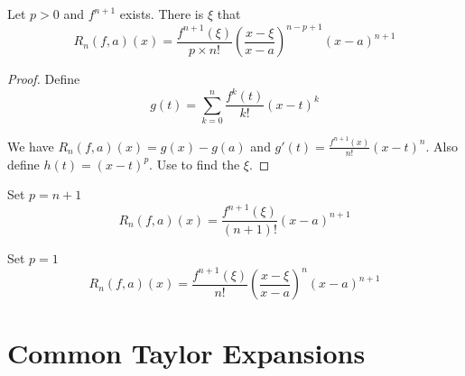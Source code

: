 \begin{theorem}
    Let $p > 0$ and $f^{n+1}$ exists. There is $\xi$ that
    \begin{equation}
        R_n(f,a)(x) = \frac{f^{n+1}(\xi)}{p \times n!}\left( \frac{x-\xi}{x-a} \right)^{n-p+1} (x-a)^{n+1}
    \end{equation}
\end{theorem}
\begin{proof}
    Define
    \begin{equation}
        g(t) = \sum_{k=0}^n \frac{f^k (t)}{k!}(x-t)^k
    \end{equation}
    
    We have $R_n (f,a)(x) = g(x) - g(a)$ and $g'(t) = \frac{f^{n+1}(x)}{n!}(x-t)^n$. Also define $h(t) = (x-t)^p$. Use  to find the $\xi$.
\end{proof}

\begin{theorem}
    Set $p = n+1$
    \begin{equation}
        R_n (f,a)(x) = \frac{f^{n+1}(\xi)}{(n+1)!}(x-a)^{n+1}
    \end{equation}
\end{theorem}

\begin{theorem}
    Set $p=1$
    \begin{equation}
        R_n (f,a)(x) = \frac{f^{n+1}(\xi)}{n!}\left( \frac{x-\xi}{x-a} \right)^n (x-a)^{n+1}
    \end{equation}
\end{theorem}



\section{Common Taylor Expansions}



